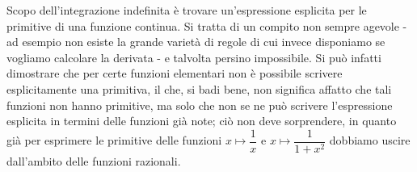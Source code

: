 \documentclass{article}
\theoremstyle{plain}
\theoremstyle{definition}
\theoremstyle{remark}
\begin{document}
Scopo dell'integrazione indefinita è trovare un'espressione esplicita per le primitive di una funzione continua.
Si tratta di un compito non sempre agevole - ad esempio non esiste la grande varietà di regole di cui invece disponiamo se vogliamo calcolare la derivata - 
e talvolta persino impossibile. Si può infatti dimostrare che per certe funzioni elementari non è possibile scrivere esplicitamente una primitiva, il che, si badi bene, 
non significa affatto che tali funzioni non hanno primitive, ma solo che non se ne può scrivere l'espressione esplicita in termini delle funzioni già note;
ciò non deve sorprendere, in quanto già per esprimere le primitive delle funzioni $x\mapsto \dfrac{1}{x}$ e $x\mapsto\dfrac{1}{1+x^2}$ dobbiamo uscire dall'ambito delle funzioni razionali.

\vspace{10pt}
\end{document}
